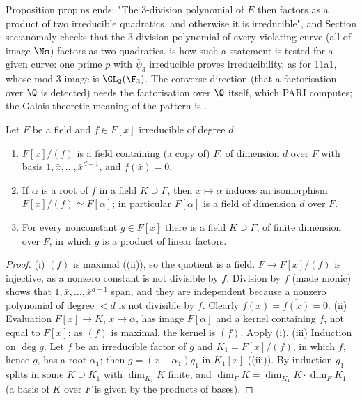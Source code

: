 \begin{paperlink}\label{pl:rings:ns-divpol}
Proposition prop:ns ends: "The $3$-division polynomial of $E$ then factors as a product of two irreducible quadratics,
and otherwise it is irreducible", and Section sec:anomaly checks that the $3$-division polynomial of every violating curve (all of
image $\Ns$) factors as two quadratics.
 is how such a statement is tested for a given curve: one prime $p$ with $\bar\psi_3$ irreducible proves
irreducibility, as for 11a1, whose mod $3$ image is $\GL_2(\F_3)$. The converse direction (that a factorisation over $\Q$ is
detected) needs the factorisation over $\Q$ itself, which PARI computes; the Galois-theoretic meaning of the pattern is
.
\end{paperlink}

\begin{theorem}\label{thm:rings:adjoin-root}
Let $F$ be a field and $f\in F[x]$ irreducible of degree $d$.
\begin{enumerate}[label=(\roman*)]
\item $F[x]/(f)$ is a field containing (a copy of) $F$, of dimension $d$ over $F$ with basis $1,\bar x,\dots,\bar x^{d-1}$, and $f(\bar x)=0$.
\item If $\alpha$ is a root of $f$ in a field $K\supseteq F$, then $x\mapsto\alpha$ induces an isomorphism $F[x]/(f)\simeq F[\alpha]$; in particular $F[\alpha]$ is a
field of dimension $d$ over $F$.
\item For every nonconstant $g\in F[x]$ there is a field $K\supseteq F$, of finite dimension over $F$, in which $g$ is a product of linear factors.
\end{enumerate}
\end{theorem}

\begin{proof}
(i) $(f)$ is maximal ((ii)), so the quotient is a field. $F\to F[x]/(f)$ is injective, as a nonzero constant is not
divisible by $f$. Division by $f$ (made monic) shows that $1,\bar x,\dots,\bar x^{d-1}$ span, and they are independent because a nonzero
polynomial of degree $<d$ is not divisible by $f$. Clearly $f(\bar x)=\overline{f(x)}=0$.
(ii) Evaluation $F[x]\to K$, $x\mapsto\alpha$, has image $F[\alpha]$ and a kernel containing $f$, not equal to $F[x]$; as $(f)$ is maximal, the kernel is
$(f)$. Apply (i).
(iii) Induction on $\deg g$. Let $f$ be an irreducible factor of $g$ and $K_1=F[x]/(f)$, in which $f$, hence $g$, has a root $\alpha_1$; then
$g=(x-\alpha_1)g_1$ in $K_1[x]$ ((iii)). By induction $g_1$ splits in some $K\supseteq K_1$ with $\dim_{K_1}K$ finite, and
$\dim_FK=\dim_{K_1}K\cdot\dim_FK_1$ (a basis of $K$ over $F$ is given by the products of bases).
\end{proof}

